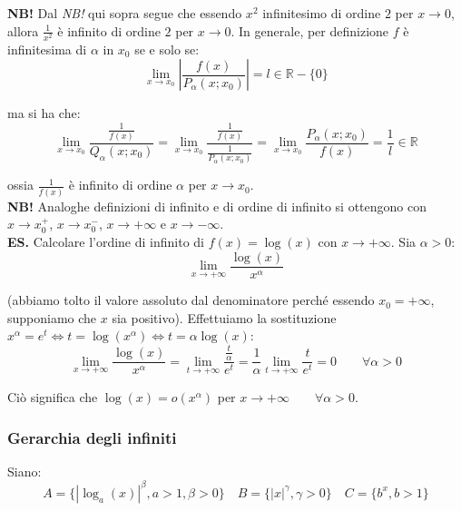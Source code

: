 \documentclass{article}
\begin{document}
\noindent\textbf{NB!} Dal \textit{NB!} qui sopra segue che essendo $x^2$ infinitesimo di ordine $2$ per $x \to 0$, allora $\frac{1}{x^2}$ è infinito di ordine $2$ per $x \to 0$. In generale, per definizione $f$ è infinitesima di $\alpha$ in $x_0$ se e solo se:
\begin{equation*}
    \lim_{x \to x_0} \left|\frac{f(x)}{P_\alpha(x; x_0)}\right| = l \in \mathbb{R} - \{0\}
\end{equation*}

\noindent ma si ha che:
\begin{equation*}
    \lim_{x \to x_0} \frac{\frac{1}{f(x)}}{Q_\alpha(x; x_0)} = \lim_{x \to x_0} \frac{\frac{1}{f(x)}}{\frac{1}{P_\alpha(x; x_0)}} = \lim_{x \to x_0} \frac{P_\alpha(x; x_0)}{f(x)} = \frac{1}{l} \in \mathbb{R}
\end{equation*}

\noindent ossia $\frac{1}{f(x)}$ è infinito di ordine $\alpha$ per $x \to x_0$.\\

\noindent\textbf{NB!} Analoghe definizioni di infinito e di ordine di infinito si ottengono con $x \to x_0^+$, $x \to x_0^-$, $x \to +\infty$ e $x \to -\infty$.\\

\noindent\textbf{ES.} Calcolare l'ordine di infinito di $f(x) = \log(x)$ con $x \to +\infty$. Sia $\alpha > 0$:
\begin{equation*}
    \lim_{x \to +\infty} \frac{\log(x)}{x^\alpha}
\end{equation*}

\noindent (abbiamo tolto il valore assoluto dal denominatore perché essendo $x_0 = +\infty$, supponiamo che $x$ sia positivo). Effettuiamo la sostituzione $x^\alpha = e^t \iff t = \log(x^\alpha) \iff t = \alpha \log(x)$:
\begin{equation*}
    \lim_{x \to +\infty} \frac{\log(x)}{x^\alpha} = \lim_{t \to +\infty} \frac{\frac{t}{\alpha}}{e^t} = \frac{1}{\alpha} \lim_{t \to +\infty} \frac{t}{e^t} = 0 \qquad \forall \alpha > 0
\end{equation*}

\noindent Ciò significa che $\log(x) = o(x^\alpha)$ per $x \to +\infty \qquad \forall \alpha > 0$.

\subsubsection{Gerarchia degli infiniti}
Siano:
\begin{equation*}
    A = \{|\log_a(x)|^\beta, a > 1, \beta > 0\} \quad B = \{|x|^\gamma, \gamma > 0\} \quad C = \{b^x, b> 1\}
\end{equation*}
\end{document}
